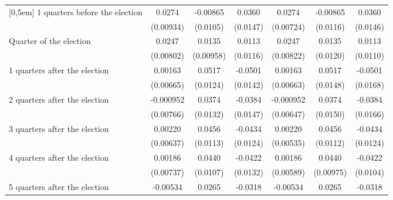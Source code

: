 \begin{table}[!ht]
\begin{tabular}{l*{6}{c}}
[0,5em]
 1 quarters before the election&      0.0274\sym{**} &    -0.00865         &      0.0360\sym{*}  &      0.0274\sym{***}&    -0.00865         &      0.0360\sym{*}  \\
                    &   (0.00934)         &    (0.0105)         &    (0.0147)         &   (0.00724)         &    (0.0116)         &    (0.0146)         \\
[0,5em]
Quarter of the election&      0.0247\sym{**} &      0.0135         &      0.0113         &      0.0247\sym{**} &      0.0135         &      0.0113         \\
                    &   (0.00802)         &   (0.00958)         &    (0.0116)         &   (0.00822)         &    (0.0120)         &    (0.0110)         \\
[0,5em]
 1 quarters after the election&     0.00163         &      0.0517\sym{***}&     -0.0501\sym{***}&     0.00163         &      0.0517\sym{***}&     -0.0501\sym{**} \\
                    &   (0.00665)         &    (0.0124)         &    (0.0142)         &   (0.00663)         &    (0.0148)         &    (0.0168)         \\
[0,5em]
 2 quarters after the election&   -0.000952         &      0.0374\sym{**} &     -0.0384\sym{**} &   -0.000952         &      0.0374\sym{*}  &     -0.0384\sym{*}  \\
                    &   (0.00766)         &    (0.0132)         &    (0.0147)         &   (0.00647)         &    (0.0150)         &    (0.0166)         \\
[0,5em]
 3 quarters after the election&     0.00220         &      0.0456\sym{***}&     -0.0434\sym{***}&     0.00220         &      0.0456\sym{***}&     -0.0434\sym{***}\\
                    &   (0.00637)         &    (0.0113)         &    (0.0124)         &   (0.00535)         &    (0.0112)         &    (0.0124)         \\
[0,5em]
 4 quarters after the election&     0.00186         &      0.0440\sym{***}&     -0.0422\sym{**} &     0.00186         &      0.0440\sym{***}&     -0.0422\sym{***}\\
                    &   (0.00737)         &    (0.0107)         &    (0.0132)         &   (0.00589)         &   (0.00975)         &    (0.0104)         \\
[0,5em]
 5 quarters after the election&    -0.00534         &      0.0265\sym{**} &     -0.0318\sym{**} &    -0.00534         &      0.0265\sym{*}  &     -0.0318\sym{**} \\

\end{tabular}
\end{table}
